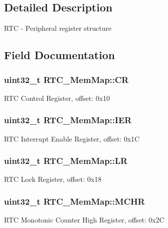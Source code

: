 \subsection{Detailed Description}
R\+T\+C -\/ Peripheral register structure 

\subsection{Field Documentation}
\hypertarget{struct_r_t_c___mem_map_a05c71be888cd40a4d91c631260d684d7}{}
\subsubsection[{C\+R}]{\setlength{\rightskip}{0pt plus 5cm}uint32\+\_\+t R\+T\+C\+\_\+\+Mem\+Map\+::\+C\+R}\label{struct_r_t_c___mem_map_a05c71be888cd40a4d91c631260d684d7}
R\+T\+C Control Register, offset\+: 0x10 \hypertarget{struct_r_t_c___mem_map_a1db69b589f5bfc5faa12b9c54e7c8061}{}
\subsubsection[{I\+E\+R}]{\setlength{\rightskip}{0pt plus 5cm}uint32\+\_\+t R\+T\+C\+\_\+\+Mem\+Map\+::\+I\+E\+R}\label{struct_r_t_c___mem_map_a1db69b589f5bfc5faa12b9c54e7c8061}
R\+T\+C Interrupt Enable Register, offset\+: 0x1\+C \hypertarget{struct_r_t_c___mem_map_a6d1b4fe68ed53926b57392e7ad582469}{}
\subsubsection[{L\+R}]{\setlength{\rightskip}{0pt plus 5cm}uint32\+\_\+t R\+T\+C\+\_\+\+Mem\+Map\+::\+L\+R}\label{struct_r_t_c___mem_map_a6d1b4fe68ed53926b57392e7ad582469}
R\+T\+C Lock Register, offset\+: 0x18 \hypertarget{struct_r_t_c___mem_map_a3b815cd903e7b828fd2b147aae5a77e1}{}
\subsubsection[{M\+C\+H\+R}]{\setlength{\rightskip}{0pt plus 5cm}uint32\+\_\+t R\+T\+C\+\_\+\+Mem\+Map\+::\+M\+C\+H\+R}\label{struct_r_t_c___mem_map_a3b815cd903e7b828fd2b147aae5a77e1}
R\+T\+C Monotonic Counter High Register, offset\+: 0x2\+C \hypertarget{struct_r_t_c___mem_map_a949f49a34b644f4bfa1bd05a3ed00322}{}
